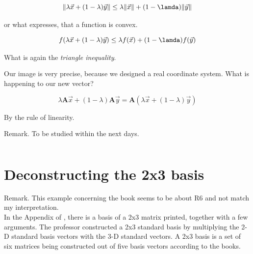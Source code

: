\documentclass[a4paper]{article}
\begin{document}
\begin{displaymath}
\|\lambda\vec{x} + (1-\lambda)\vec{y}\| \leq \lambda\|\vec{x}\| + (1-\lamda)\|\vec{y}\|
\end{displaymath}

or what expresses, that a function is convex.

\begin{displaymath}
f(\lambda\vec{x} + (1-\lambda)\vec{y}) \leq \lambda f(\vec{x}) + (1-\lamda)f(\vec{y})
\end{displaymath}

What is again the \emph{triangle inequality}.

Our image is very precise, because we designed a real coordinate system. What is happening to our new vector? 

\begin{displaymath}
\lambda\boldsymbol{A}\vec{x} + (1-\lambda)\boldsymbol{A}\vec{y} = \boldsymbol{A}(\lambda\vec{x} + (1-\lambda)\vec{y})
\end{displaymath}

By the rule of linearity.

Remark. To be studied within the next days. 

\begin{displaymath}
\end{displaymath}

\section{Deconstructing the 2x3 basis} 


Remark. This example concerning the book \cite{Strang1} seems to be about R6 and not match my interpretation.\\

In the Appendix of \cite{Strang1}, there is a basis of a 2x3 matrix printed, together with a few arguments. The professor constructed a 2x3 standard basis by multiplying the 2-D standard basis vectors with the 3-D standard vectors. A 2x3 basis is a set of six matrices being constructed out of five basis vectors according to the books. \\
\end{document}
